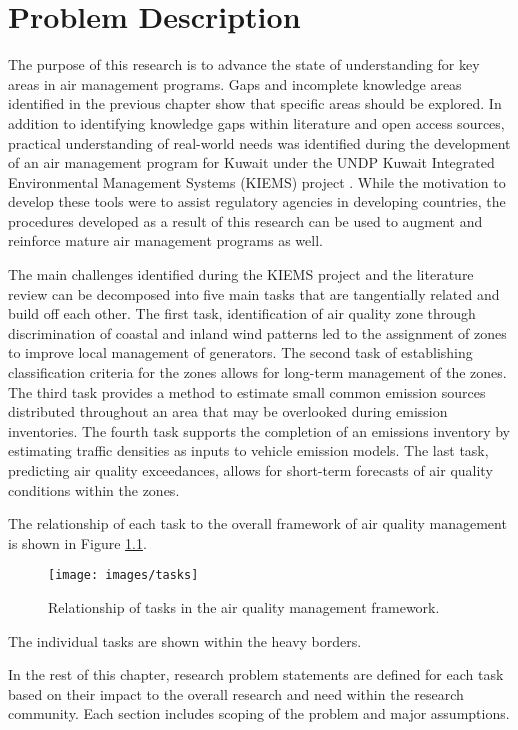 \chapter{Problem Description}
The purpose of this research is to advance the state of understanding for key areas in air management programs. Gaps and incomplete knowledge areas identified in the previous chapter show that specific areas should be explored. In addition to identifying knowledge gaps within literature and open access sources, practical understanding of real-world needs was identified during the development of an air management program for Kuwait under the UNDP Kuwait Integrated Environmental Management Systems (KIEMS) project \citep{UNDP2012}.  While the motivation to develop these tools were to assist regulatory agencies in developing countries, the procedures developed as a result of this research can be used to augment and reinforce mature air management programs as well.  

The main challenges identified during the KIEMS project and the literature review can be decomposed into five main tasks that are tangentially related and build off each other. The first task, identification of air quality zone through discrimination of coastal and inland wind patterns led to the assignment of zones to improve local management of generators. The second task of establishing classification criteria for the zones allows for long-term management of the zones.  The third task provides a method to estimate small common emission sources distributed throughout an area that may be overlooked during emission inventories. The fourth task supports the completion of an emissions inventory by estimating traffic densities as inputs to vehicle emission models. The last task, predicting air quality exceedances, allows for short-term forecasts of air quality conditions within the zones. 

The relationship of each task to the overall framework of air quality management is shown in Figure \ref{fig:tasks}.
%
\begin{figure}[H]
\centering
\texttt{[image: images/tasks]}  %
\caption{Relationship of tasks in the air quality management framework.}
\label{fig:tasks}
\end{figure}
%
The individual tasks are shown within the heavy borders.

In the rest of this chapter, research problem statements are defined for each task based on their impact to the overall research and need within the research community. Each section includes scoping of the problem and major assumptions.

